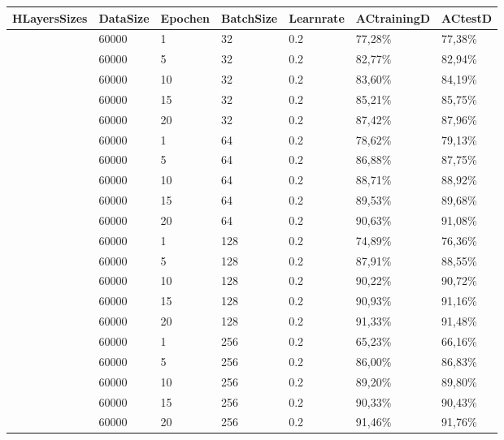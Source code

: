 \documentclass[12pt]{article}
\begin{document}
\begin{table}[H]
    \centering
    \begin{tabular}{|l|l|l|l|l|l|l|}
    \hline
        HLayersSizes & DataSize & Epochen & BatchSize & Learnrate & ACtrainingD & ACtestD \\ \hline
        [784, 100, 10] & 60000 & 1 & 32 & 0.2 & 77,28\% & 77,38\% \\ \hline
        [784, 100, 10] & 60000 & 5 & 32 & 0.2 & 82,77\% & 82,94\% \\ \hline
        [784, 100, 10] & 60000 & 10 & 32 & 0.2 & 83,60\% & 84,19\% \\ \hline
        [784, 100, 10] & 60000 & 15 & 32 & 0.2 & 85,21\% & 85,75\% \\ \hline
        [784, 100, 10] & 60000 & 20 & 32 & 0.2 & 87,42\% & 87,96\% \\ \hline
        [784, 100, 10] & 60000 & 1 & 64 & 0.2 & 78,62\% & 79,13\% \\ \hline
        [784, 100, 10] & 60000 & 5 & 64 & 0.2 & 86,88\% & 87,75\% \\ \hline
        [784, 100, 10] & 60000 & 10 & 64 & 0.2 & 88,71\% & 88,92\% \\ \hline
        [784, 100, 10] & 60000 & 15 & 64 & 0.2 & 89,53\% & 89,68\% \\ \hline
        [784, 100, 10] & 60000 & 20 & 64 & 0.2 & 90,63\% & 91,08\% \\ \hline
        [784, 100, 10] & 60000 & 1 & 128 & 0.2 & 74,89\% & 76,36\% \\ \hline
        [784, 100, 10] & 60000 & 5 & 128 & 0.2 & 87,91\% & 88,55\% \\ \hline
        [784, 100, 10] & 60000 & 10 & 128 & 0.2 & 90,22\% & 90,72\% \\ \hline
        [784, 100, 10] & 60000 & 15 & 128 & 0.2 & 90,93\% & 91,16\% \\ \hline
        [784, 100, 10] & 60000 & 20 & 128 & 0.2 & 91,33\% & 91,48\% \\ \hline
        [784, 100, 10] & 60000 & 1 & 256 & 0.2 & 65,23\% & 66,16\% \\ \hline
        [784, 100, 10] & 60000 & 5 & 256 & 0.2 & 86,00\% & 86,83\% \\ \hline
        [784, 100, 10] & 60000 & 10 & 256 & 0.2 & 89,20\% & 89,80\% \\ \hline
        [784, 100, 10] & 60000 & 15 & 256 & 0.2 & 90,33\% & 90,43\% \\ \hline
        [784, 100, 10] & 60000 & 20 & 256 & 0.2 & 91,46\% & 91,76\% \\ \hline
    \end{tabular}
\end{table}
\end{document}
